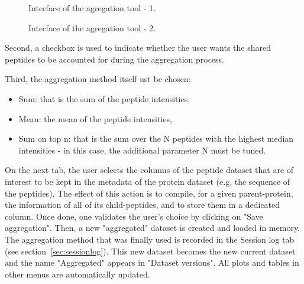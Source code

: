 \documentclass[12pt]{article}
\begin{document}
{\begin {figure}
\centering
{}
\caption{Interface of the agregation tool - 1.}\label{fig:agreg1}
\end {figure}

\begin {figure}
\centering
{}
\caption{Interface of the agregation tool - 2.}\label{fig:agreg2}
\end {figure}


Second, a checkbox is used to indicate whether the user wants the shared 
peptides to be accounted for during the aggregation process.

Third, the aggregation method itself ust be chosen: 
\begin{itemize}
\item Sum: that is the sum of the peptide intensities,
\item Mean: the mean of the peptide intensities,
\item Sum on top n: that is the sum over the N peptides with the highest median 
intensities - in this case, the additional parameter N must be tuned.
\end{itemize}

On the next tab, the user selects the columns of the peptide dataset that 
are of interest to be kept in the metadata of the protein dataset (e.g. the 
sequence of the peptides). The effect of this action is to compile, for a 
given parent-protein, the information of all of its child-peptides, and to 
store them in a dedicated column. Once done, one validates the user's choice 
by clicking on "Save aggregation". Then, a new "aggregated" dataset is 
created and loaded in memory. The aggregation method that was finally used is 
recorded in the Session log tab (see section~\ref{sec:sessionlog}). This new 
dataset becomes the new current dataset and the name "Aggregated" appears in 
"Dataset versions". All plots and tables in other menus are automatically 
updated.

}
\end{document}
